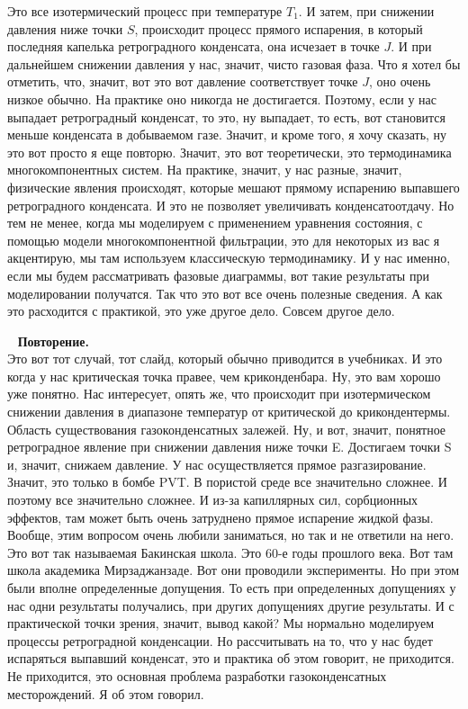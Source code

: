 \documentclass[main.tex]{subfiles}
\begin{document}
Это все изотермический процесс при температуре $T_1$.
И затем, при снижении давления ниже точки $S$, происходит процесс прямого испарения, в который последняя капелька ретроградного конденсата, она исчезает в точке $J$.
И при дальнейшем снижении давления у нас, значит, чисто газовая фаза.
Что я хотел бы отметить, что, значит, вот это вот давление соответствует точке $J$, оно очень низкое обычно.
На практике оно никогда не достигается.
Поэтому, если у нас выпадает ретроградный конденсат, то это, ну выпадает, то есть, вот становится меньше конденсата в добываемом газе.
Значит, и кроме того, я хочу сказать, ну это вот просто я еще повторю.
Значит, это вот теоретически, это термодинамика многокомпонентных систем.
На практике, значит, у нас разные, значит, физические явления происходят, которые мешают прямому испарению выпавшего ретроградного конденсата.
И это не позволяет увеличивать конденсатоотдачу.
Но тем не менее, когда мы моделируем с применением уравнения состояния, с помощью модели многокомпонентной фильтрации, это для некоторых из вас я акцентирую, мы там используем классическую термодинамику.
И у нас именно, если мы будем рассматривать фазовые диаграммы, вот такие результаты при моделировании получатся.
Так что это вот все очень полезные сведения.
А как это расходится с практикой, это уже другое дело.
Совсем другое дело.

\ \newline
\textbf{Повторение.}\\
Это вот тот случай, тот слайд, который обычно приводится в учебниках.
И это когда у нас критическая точка правее, чем криконденбара.
Ну, это вам хорошо уже понятно.
Нас интересует, опять же, что происходит при изотермическом снижении давления в диапазоне температур от критической до крикондентермы.
Область существования газоконденсатных залежей.
Ну, и вот, значит, понятное ретроградное явление при снижении давления ниже точки E.
Достигаем точки S и, значит, снижаем давление.
У нас осуществляется прямое разгазирование.
Значит, это только в бомбе PVT.
В пористой среде все значительно сложнее.
И поэтому все значительно сложнее.
И из-за капиллярных сил, сорбционных эффектов, там может быть очень затруднено прямое испарение жидкой фазы.
Вообще, этим вопросом очень любили заниматься, но так и не ответили на него.
Это вот так называемая Бакинская школа.
Это 60-е годы прошлого века.
Вот там школа академика Мирзаджанзаде.
Вот они проводили эксперименты.
Но при этом были вполне определенные допущения.
То есть при определенных допущениях у нас одни результаты получались, при других допущениях другие результаты.
И с практической точки зрения, значит, вывод какой?
Мы нормально моделируем процессы ретроградной конденсации.
Но рассчитывать на то, что у нас будет испаряться выпавший конденсат, это и практика об этом говорит, не приходится.
Не приходится, это основная проблема разработки газоконденсатных месторождений.
Я об этом говорил.
\end{document}
